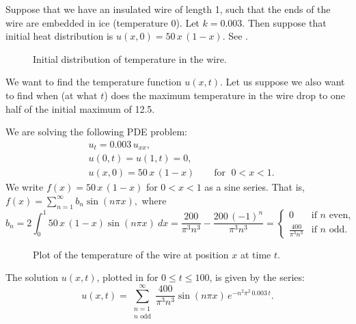 \begin{example}
Suppose that we have an insulated wire of length 1, such
that
the ends of the wire are embedded in ice (temperature 0).
Let $k=0.003$.  Then suppose that initial heat distribution
is $u(x,0) = 50\,x\,(1-x)$.
See .

\begin{figure}[h!t]
\capstart
\begin{center}
\caption{Initial distribution of temperature in the
wire.\label{heat:wireexinitfig}}
\end{center}
\end{figure}

We want to find the temperature function $u(x,t)$.  Let us suppose we also
want to find when (at what $t$) does the maximum temperature in the wire 
drop to one half of the initial maximum of 12.5.

We are solving the following PDE problem:
\begin{align*}
& u_t = 0.003 \, u_{xx} , \\
& u(0,t) = u(1,t) = 0 , \\
& u(x,0) = 50\,x\,(1-x) \qquad \text{for } \; 0 < x < 1 .
\end{align*}
We write $f(x) = 50\,x\,(1-x)$ for $0 < x < 1$ as a sine series.  That is,
$
f(x) = \sum_{n=1}^\infty b_n \sin (n \pi x) ,
$
where
\begin{equation*}
b_n = 2 \int_0^1 50\,x\,(1-x) \sin (n \pi x) ~dx
= 
\frac{200}{{\pi }^{3}{n}^{3}}-\frac{200\,{\left( -1\right) }^{n}}{{\pi }^{3}{n}^{3}}
=
\begin{cases}
0 & \text{if } n \text{ even} , \\
\frac{400}{\pi^3 n^3} & \text{if } n \text{ odd} .
\end{cases}
\end{equation*}

\begin{figure}[h!t]
\capstart
\begin{center}
\caption{Plot of the temperature of the wire at position $x$
at time $t$.\label{heat:wireexfig}}
\end{center}
\end{figure}


The solution $u(x,t)$, plotted in
 for $0 \leq t \leq 100$,
is given by the series:
\begin{equation*}
u(x,t) = 
\sum_{\substack{n=1 \\ n \text{ odd}}}^\infty
\frac{400}{\pi^3 n^3}
\sin (n \pi x )
\, e^{-n^2 \pi^2 \, 0.003 \, t} .
\end{equation*}



\end{example}
